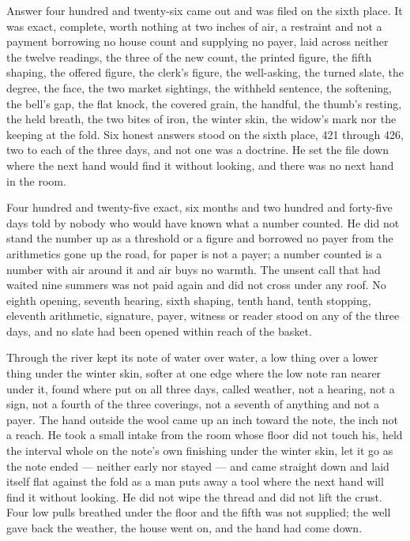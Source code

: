 Answer four hundred and twenty-six came out and was filed on the sixth place. It was exact, complete, worth nothing at two inches of air, a restraint and not a payment borrowing no house count and supplying no payer, laid across neither the twelve readings, the three of the new count, the printed figure, the fifth shaping, the offered figure, the clerk's figure, the well-asking, the turned slate, the degree, the face, the two market sightings, the withheld sentence, the softening, the bell's gap, the flat knock, the covered grain, the handful, the thumb's resting, the held breath, the two bites of iron, the winter skin, the widow's mark nor the keeping at the fold. Six honest answers stood on the sixth place, 421 through 426, two to each of the three days, and not one was a doctrine. He set the file down where the next hand would find it without looking, and there was no next hand in the room.

Four hundred and twenty-five exact, six months and two hundred and forty-five days told by nobody who would have known what a number counted. He did not stand the number up as a threshold or a figure and borrowed no payer from the arithmetics gone up the road, for paper is not a payer; a number counted is a number with air around it and air buys no warmth. The unsent call that had waited nine summers was not paid again and did not cross under any roof. No eighth opening, seventh hearing, sixth shaping, tenth hand, tenth stopping, eleventh arithmetic, signature, payer, witness or reader stood on any of the three days, and no slate had been opened within reach of the basket.

Through  the river kept its note of water over water, a low thing over a lower thing under the winter skin, softer at one edge where the low note ran nearer under it, found where put on all three days, called weather, not a hearing, not a sign, not a fourth of the three coverings, not a seventh of anything and not a payer. The hand outside the wool came up an inch toward the note, the inch not a reach. He took a small intake from the room whose floor did not touch his, held the interval whole on the note's own finishing under the winter skin, let it go as the note ended --- neither early nor stayed --- and came straight down and laid itself flat against the fold as a man puts away a tool where the next hand will find it without looking. He did not wipe the thread and did not lift the crust. Four low pulls breathed under the floor and the fifth was not supplied; the well gave back the weather, the house went on, and the hand had come down.
